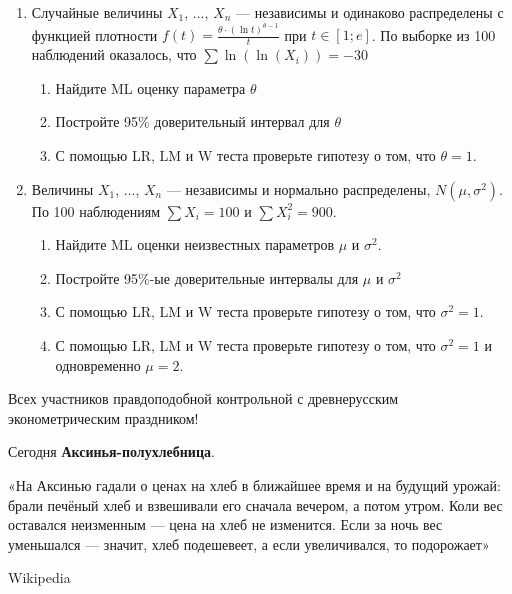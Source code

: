 \documentclass[12pt, a4paper]{article}
\begin{document}
\begin{enumerate}
\item  Случайные величины $X_{1}$, ..., $X_{n}$ — независимы и одинаково распределены с функцией плотности $f(t)=\frac{\theta \cdot\left(\ln  t\right)^{\theta -1}}{t} $  при  $t\in
\left[1;e\right]$. По выборке из 100 наблюдений оказалось, что $\sum{\ln(\ln(X_{i}))}=-30$
\begin{enumerate}
\item Найдите ML оценку параметра $\theta$
\item Постройте 95\% доверительный интервал для $\theta$
\item С помощью LR, LM и W теста проверьте гипотезу о том, что $\theta=1$.
\end{enumerate}

\item Величины $X_{1}$, ..., $X_{n}$ — независимы и нормально распределены, $N(\mu,\sigma^2)$. По 100 наблюдениям $\sum X_i=100$ и  $\sum X_i^2=900$.
\begin{enumerate}
\item Найдите ML оценки неизвестных параметров $\mu$ и $\sigma^2$.
\item Постройте 95\%-ые доверительные интервалы для $\mu$ и $\sigma^2$
\item С помощью LR, LM и W теста проверьте гипотезу о том, что $\sigma^2=1$.
\item С помощью LR, LM и W теста проверьте гипотезу о том, что $\sigma^2=1$ и одновременно $\mu=2$.
\end{enumerate}

\end{enumerate}

Всех участников правдоподобной контрольной с древнерусским эконометрическим праздником!

\vspace{20pt}

Сегодня \textbf{Аксинья-полухлебница}.

\vspace{20pt}

«На Аксинью гадали о ценах на хлеб в ближайшее время и на будущий урожай: брали печёный хлеб и взвешивали его сначала вечером, а потом утром. Коли вес оставался неизменным — цена на хлеб не изменится. Если за ночь вес уменьшался — значит, хлеб подешевеет, а если увеличивался, то подорожает»

\begin{flushright}
Wikipedia
\end{flushright}
\end{document}
